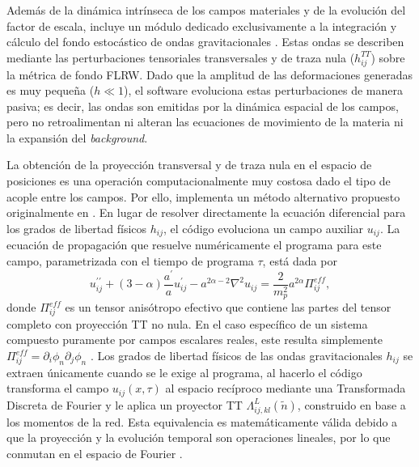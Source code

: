 Además de la dinámica intrínseca de los campos materiales y de la evolución del factor de escala, \CosmoLattice incluye un módulo dedicado exclusivamente a la integración y cálculo del fondo estocástico de ondas gravitacionales \cite{Figueroa_GW_2022}. Estas ondas se describen mediante las perturbaciones tensoriales transversales y de traza nula ($h_{ij}^{TT}$) sobre la métrica de fondo FLRW. Dado que la amplitud de las deformaciones generadas es muy pequeña ($h \ll 1$), el software evoluciona estas perturbaciones de manera pasiva; es decir, las ondas son emitidas por la dinámica espacial de los campos, pero no retroalimentan ni alteran las ecuaciones de movimiento de la materia ni la expansión del \textit{background}.

La obtención de la proyección transversal y de traza nula en el espacio de posiciones es una operación computacionalmente muy costosa dado el tipo de acople entre los campos. Por ello, \CosmoLattice implementa un método alternativo propuesto originalmente en \cite{GarciaBellido_2007}. En lugar de resolver directamente la ecuación diferencial para los grados de libertad físicos $h_{ij}$, el código evoluciona un campo auxiliar $u_{ij}$. La ecuación de propagación que resuelve numéricamente el programa para este campo, parametrizada con el tiempo de programa $\tau$, está dada por
\begin{equation}
    u_{ij}^{\prime \prime} + (3 - \alpha) \frac{a^\prime}{a} u_{ij}^\prime - a^{2\alpha - 2} \nabla^2 u_{ij} = \frac{2}{m_p^2} a^{2\alpha} \Pi_{ij}^{eff},
\end{equation}
donde $\Pi_{ij}^{eff}$ es un tensor anisótropo efectivo que contiene las partes del tensor completo con proyección TT no nula. En el caso específico de un sistema compuesto puramente por campos escalares reales, este resulta simplemente $\Pi_{ij}^{eff} = \partial_i \phi_n \partial_j \phi_n$ \cite{Figueroa_GW_2022, CosmoLattice_Note2_GWs}. Los grados de libertad físicos de las ondas gravitacionales $h_{ij}$ se extraen únicamente cuando se le exige al programa, al hacerlo el código transforma el campo $u_{ij}(x, \tau)$ al espacio recíproco mediante una Transformada Discreta de Fourier y le aplica un proyector TT $\Lambda_{ij,kl}^L (\tilde{n})$, construido en base a los momentos de la red. Esta equivalencia es matemáticamente válida debido a que la proyección y la evolución temporal son operaciones lineales, por lo que conmutan en el espacio de Fourier \cite{GarciaBellido_2007}.

